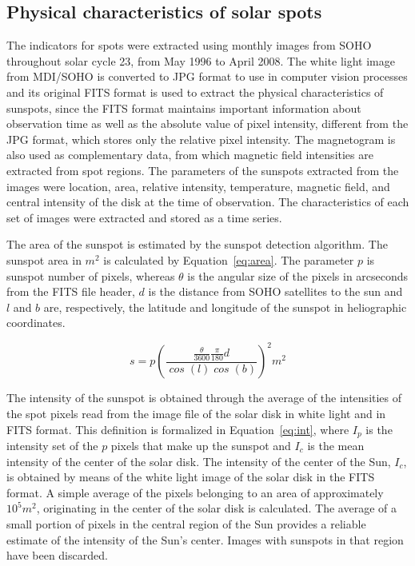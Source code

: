 \documentclass[namedreferences]{solarphysics}
\begin{document}
\begin{article}
\subsection{Physical characteristics of solar spots} %
  \label{S-phy}
The indicators for spots were extracted using monthly images from SOHO throughout solar cycle 23,
from May 1996 to April 2008.
The white light image from MDI/SOHO is converted to JPG format to use in computer vision processes and its original FITS format is used to extract the physical characteristics of sunspots, 
since the FITS format maintains important information about observation time as well as the absolute value of pixel intensity, different from the JPG format, which stores only the relative pixel intensity.
The magnetogram is also used as complementary data, from which magnetic field intensities are extracted from spot regions.
The parameters of the sunspots extracted from the images were location, area, relative intensity, temperature, magnetic field, and central intensity of the disk at the time of observation.
The characteristics of each set of images were extracted and stored as a time series.

The area of the sunspot is estimated by the sunspot detection algorithm.
The sunspot area in $m^2$ is calculated by Equation~\ref{eq:area}.
The parameter $p$ is sunspot number of pixels,
whereas $\theta$ is the angular size of the pixels in arcseconds from the FITS file header,
$d$ is the distance from SOHO satellites to the sun and $l$ and $b$ are,
respectively, the latitude and longitude of the sunspot in heliographic coordinates.

\begin{equation} \label{eq:area}
\label{eq:area}
    \mathit{s = p\left (\frac{\frac{\theta}{3600}\frac{\pi}{180}d}{\cos(l)\cos(b)} \right)}^{2} m^2
\end{equation}

The intensity of the sunspot is obtained through the average of the intensities of the spot pixels read from the image file of the solar disk in white light and in FITS format.
This definition is formalized in Equation~\ref{eq:int},
where $I_{p}$ is the intensity set of the $p$ pixels that make up the sunspot and $I_{c}$ is the mean intensity of the center of the solar disk.
The intensity of the center of the Sun, $I_{c}$, is obtained by means of the white light image of the solar disk in the FITS format.
A simple average of the pixels belonging to an area of approximately $10^5 m^2$,
originating in the center of the solar disk is calculated.
The average of a small portion of pixels in the central region of the Sun provides a reliable estimate of the intensity of the Sun’s center.
Images with sunspots in that region have been discarded.


\end{article}
\end{document}
